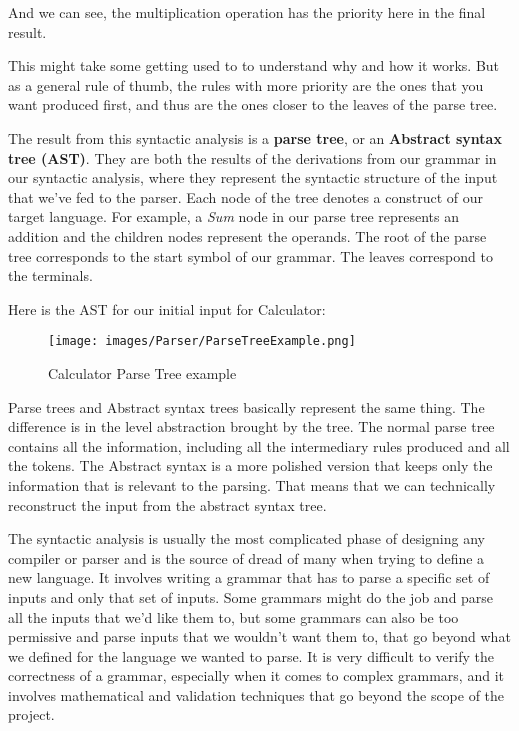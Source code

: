 \documentclass[12pt]{article}
\begin{document}
And we can see, the multiplication operation has the priority here in the final result.

This might take some getting used to to understand why and how it works. But as a general rule of thumb, the rules with more priority are the ones that you want produced first, and thus are the ones closer to the leaves of the parse tree. 

The result from this syntactic analysis is a \textbf{parse tree}, or an \textbf{Abstract syntax tree (AST)}. They are both the results of the derivations from our grammar in our syntactic analysis, where they represent the syntactic structure of the input that we’ve fed to the parser. Each node of the tree denotes a construct of our target language. For example, a \emph{Sum} node in our parse tree represents an addition and the children nodes represent the operands. The root of the parse tree corresponds to the start symbol of our grammar. The leaves correspond to the terminals.

Here is the AST for our initial input for Calculator:

\begin{figure}[ht!]
 	\centering
 	\caption{Calculator Parse Tree example}
 	\texttt{[image: images/Parser/ParseTreeExample.png]}
 	\label{lab:perceptron}
\end{figure}

Parse trees and Abstract syntax trees basically represent the same thing. The difference is in the level abstraction brought by the tree. The normal parse tree contains all the information, including all the intermediary rules produced and all the tokens. The Abstract syntax is a more polished version that keeps only the information that is relevant to the parsing. That means that we can technically reconstruct the input from the abstract syntax tree. 

The syntactic analysis is usually the most complicated phase of designing any compiler or parser and is the source of dread of many when trying to define a new language. It involves writing a grammar that has to parse a specific set of inputs and only that set of inputs. Some grammars might do the job and parse all the inputs that we’d like them to, but some grammars can also be too permissive and parse inputs that we wouldn’t want them to, that go beyond what we defined for the language we wanted to parse. It is very difficult to verify the correctness of a grammar, especially when it comes to complex grammars, and it involves mathematical and validation techniques that go beyond the scope of the project. 
\end{document}
